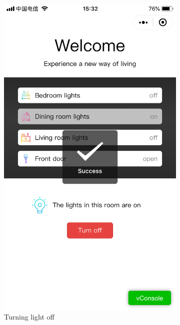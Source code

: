 \documentclass[12pt,a4paper]{report}
\begin{document}
\begin{figure}[H]
	\begin{subfigure}{.3\textwidth}
		\centering
		\includegraphics[width=.8\linewidth]{figures/2.png}
		\caption{Turning light off}
	\end{subfigure}
\begin{subfigure}{.3\textwidth}
	\centering

\end{subfigure}
\end{figure}
\end{document}
